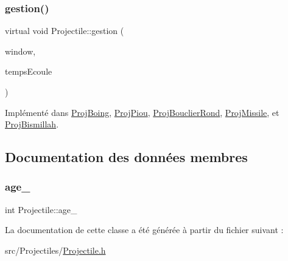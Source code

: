\mbox{\label{class_projectile_a09e02b793473660fc59a329a4dfea0ec}} 
\subsubsection{\texorpdfstring{gestion()}{gestion()}}
{\footnotesize\ttfamily virtual void Projectile\+::gestion (\begin{DoxyParamCaption}\item[{sf\+::\+Render\+Window \&}]{window,  }\item[{sf\+::\+Time}]{temps\+Ecoule }\end{DoxyParamCaption})\hspace{0.3cm}{\ttfamily [pure virtual]}}



Implémenté dans \hyperlink{class_proj_boing_aab0f3ea007483e26c38bd9f861954dae}{Proj\+Boing}, \hyperlink{class_proj_piou_a6efae1f583527446ef824fc1d2823a02}{Proj\+Piou}, \hyperlink{class_proj_bouclier_rond_afb4ab627e02e6761c6e99783749ebc89}{Proj\+Bouclier\+Rond}, \hyperlink{class_proj_missile_a6e7a2c8180b7275a1d03340229d83bf3}{Proj\+Missile}, et \hyperlink{class_proj_bismillah_a6db489d8ffa3986d073518cf79416c98}{Proj\+Bismillah}.



\subsection{Documentation des données membres}
\mbox{\label{class_projectile_a1f0a231e002d4796c32ccfeb36c887b1}} 
\subsubsection{\texorpdfstring{age\+\_\+}{age\_}}
{\footnotesize\ttfamily int Projectile\+::age\+\_\+\hspace{0.3cm}{\ttfamily [protected]}}



La documentation de cette classe a été générée à partir du fichier suivant \+:\begin{DoxyCompactItemize}
\item 
src/\+Projectiles/\hyperlink{_projectile_8h}{Projectile.\+h}\end{DoxyCompactItemize}
